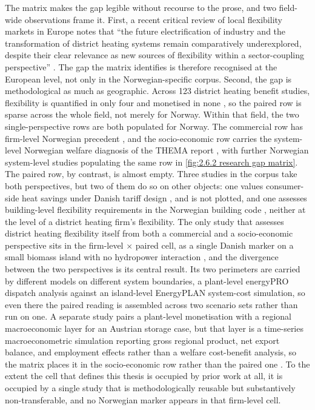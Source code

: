 \newpage
The matrix makes the gap legible without recourse to the prose, and two field-wide observations frame it. First, a recent critical review of local flexibility markets in Europe notes that ``the future electrification of industry and the transformation of district heating systems remain comparatively underexplored, despite their clear relevance as new sources of flexibility within a sector-coupling perspective'' \cite{scrocca_local_2026}. The gap the matrix identifies is therefore recognised at the European level, not only in the Norwegian-specific corpus. Second, the gap is methodological as much as geographic. Across 123 district heating benefit studies, flexibility is quantified in only four and monetised in none \cite{ahmed_district_2025}, so the paired row is sparse across the whole field, not merely for Norway. Within that field, the two single-perspective rows are both populated for Norway. The commercial row has firm-level Norwegian precedent \cite{kirkerud_impacts_2016}, and the socio-economic row carries the system-level Norwegian welfare diagnosis of the THEMA report \cite{Thema_fjernvarme_2024}, with further Norwegian system-level studies populating the same row in \autoref{fig:2.6.2 research gap matrix}. The paired row, by contrast, is almost empty. Three studies in the corpus take both perspectives, but two of them do so on other objects: one values consumer-side heat savings under Danish tariff design \cite{djorup_district_2020}, and is not plotted, and one assesses building-level flexibility requirements in the Norwegian building code \cite{rosnes_energifleksible_2023}, neither at the level of a district heating firm's flexibility. The only study that assesses district heating flexibility itself from both a commercial and a socio-economic perspective sits in the firm-level $\times$ paired cell, as a single Danish marker on a small biomass island with no hydropower interaction \cite{ostergaard_business_2019}, and the divergence between the two perspectives is its central result. Its two perimeters are carried by different models on different system boundaries, a plant-level energyPRO dispatch analysis against an island-level EnergyPLAN system-cost simulation, so even there the paired reading is assembled across two scenario sets rather than run on one. A separate study pairs a plant-level monetisation with a regional macroeconomic layer for an Austrian storage case, but that layer is a time-series macroeconometric simulation reporting gross regional product, net export balance, and employment effects rather than a welfare cost-benefit analysis, so the matrix places it in the socio-economic row rather than the paired one \cite{moser_socioeconomic_2018}. To the extent the cell that defines this thesis is occupied by prior work at all, it is occupied by a single study that is methodologically reusable but substantively non-transferable, and no Norwegian marker appears in that firm-level cell.



